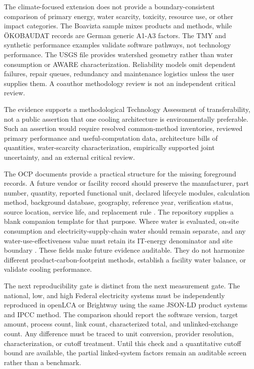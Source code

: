 \documentclass[review,12pt]{elsarticle}
\begin{document}
The climate-focused extension does not provide a boundary-consistent comparison of primary energy, water scarcity, toxicity, resource use, or other impact categories. The Boavizta sample mixes products and methods, while ÖKOBAUDAT records are German generic A1-A3 factors. The TMY and synthetic performance examples validate software pathways, not technology performance. The USGS file provides watershed geometry rather than water consumption or AWARE characterization. Reliability models omit dependent failures, repair queues, redundancy and maintenance logistics unless the user supplies them. A coauthor methodology review is not an independent critical review.

The evidence supports a methodological Technology Assessment of transferability, not a public assertion that one cooling architecture is environmentally preferable. Such an assertion would require resolved common-method inventories, reviewed primary performance and useful-computation data, architecture bills of quantities, water-scarcity characterization, empirically supported joint uncertainty, and an external critical review.

The OCP documents provide a practical structure for the missing foreground records. A future vendor or facility record should preserve the manufacturer, part number, quantity, reported functional unit, declared lifecycle modules, calculation method, background database, geography, reference year, verification status, source location, service life, and replacement rule \cite{ref51}. The repository supplies a blank companion template for that purpose. Where water is evaluated, on-site consumption and electricity-supply-chain water should remain separate, and any water-use-effectiveness value must retain its IT-energy denominator and site boundary \cite{ref52}. These fields make future evidence auditable. They do not harmonize different product-carbon-footprint methods, establish a facility water balance, or validate cooling performance.

The next reproducibility gate is distinct from the next measurement gate. The national, low, and high Federal electricity systems must be independently reproduced in openLCA or Brightway using the same JSON-LD product systems and IPCC method. The comparison should report the software version, target amount, process count, link count, characterized total, and unlinked-exchange count. Any difference must be traced to unit conversion, provider resolution, characterization, or cutoff treatment. Until this check and a quantitative cutoff bound are available, the partial linked-system factors remain an auditable screen rather than a benchmark.
\end{document}
